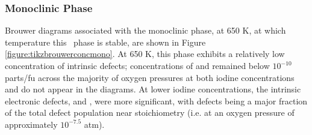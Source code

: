 \subsubsection*{Monoclinic Phase}

Brouwer diagrams associated with the monoclinic phase, at 650 K, at which temperature this \zirconia\ phase is stable, are shown in Figure \ref{figure:tikzbrouwerconcmono}. At 650 K, this phase exhibits a relatively low concentration of intrinsic defects; concentrations of  and  remained below $10^{-10}$ parts/fu across the majority of oxygen pressures at both iodine concentrations and do not appear in the diagrams. At lower iodine concentrations, the intrinsic electronic defects,  and , were more significant, with  defects being a major fraction of the total defect population near stoichiometry (i.e. at an oxygen pressure of approximately $10^{-7.5}$ atm). 

